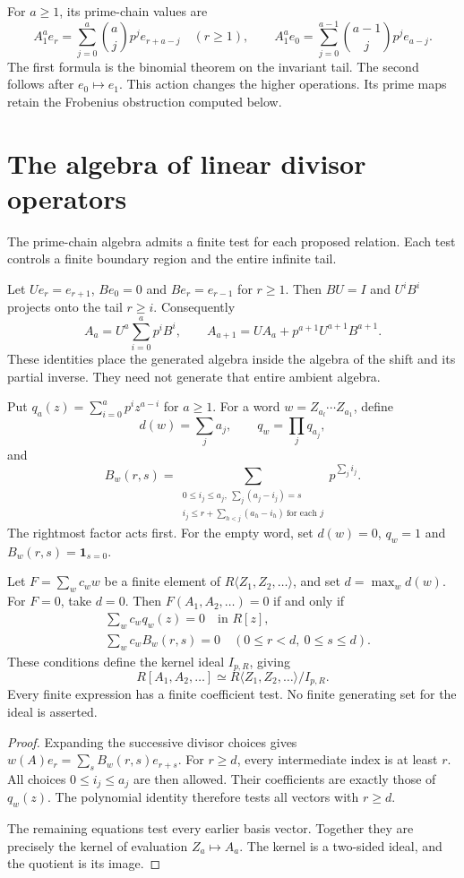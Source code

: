 For $a\geq1$, its prime-chain values are
\[
 A_1^ae_r=\sum_{j=0}^a\binom ajp^je_{r+a-j}\quad(r\geq1),
 \qquad
 A_1^ae_0=\sum_{j=0}^{a-1}\binom{a-1}jp^je_{a-j}.
\]
The first formula is the binomial theorem on the invariant tail.
The second follows after $e_0\mapsto e_1$.
This action changes the higher operations. Its prime maps retain
the Frobenius obstruction computed below.

\section{The algebra of linear divisor operators}
\label{v4-arith:hecke:sec:presentation}

The prime-chain algebra admits a finite test for each proposed relation.
Each test controls a finite boundary region and the entire infinite tail.

Let $Ue_r=e_{r+1}$, $Be_0=0$ and $Be_r=e_{r-1}$ for $r\geq1$.
Then $BU=I$ and $U^iB^i$ projects onto the tail $r\geq i$.
Consequently
\[
 A_a=U^a\sum_{i=0}^ap^iB^i,
 \qquad A_{a+1}=UA_a+p^{a+1}U^{a+1}B^{a+1}.
\]
These identities place the generated algebra inside the algebra of
the shift and its partial inverse. They need not generate that
entire ambient algebra.

Put $q_a(z)=\sum_{i=0}^ap^iz^{a-i}$ for $a\geq1$.
For a word $w=Z_{a_l}\cdots Z_{a_1}$, define
\[
 d(w)=\sum_ja_j,\qquad q_w=\prod_jq_{a_j},
\]
and
\[
 B_w(r,s)=
 \sum_{\substack{0\leq i_j\leq a_j,\ \sum_j(a_j-i_j)=s\\
 i_j\leq r+\sum_{h<j}(a_h-i_h)\ \text{for each }j}}
 p^{\sum_ji_j}.
\]
The rightmost factor acts first. For the empty word, set $d(w)=0$,
$q_w=1$ and $B_w(r,s)=\mathbf1_{s=0}$.

\begin{theorem}
\label{v4-arith:hecke:thm:presentation}
Let $F=\sum_wc_ww$ be a finite element of
$R\langle Z_1,Z_2,\ldots\rangle$, and set $d=\max_wd(w)$.
For $F=0$, take $d=0$.
Then $F(A_1,A_2,\ldots)=0$ if and only if
\begin{align*}
 &\sum_wc_wq_w(z)=0\quad\text{in }R[z],\\
 &\sum_wc_wB_w(r,s)=0
       \quad(0\leq r<d,\ 0\leq s\leq d).
\end{align*}
These conditions define the kernel ideal $I_{p,R}$, giving
\[
 R[A_1,A_2,\ldots]\simeq
 R\langle Z_1,Z_2,\ldots\rangle/I_{p,R}.
\]
Every finite expression has a finite coefficient test.
No finite generating set for the ideal is asserted.
\end{theorem}
\begin{proof}
Expanding the successive divisor choices gives
$w(A)e_r=\sum_sB_w(r,s)e_{r+s}$.
For $r\geq d$, every intermediate index is at least $r$.
All choices $0\leq i_j\leq a_j$ are then allowed.
Their coefficients are exactly those of $q_w(z)$.
The polynomial identity therefore tests all vectors with $r\geq d$.

The remaining equations test every earlier basis vector.
Together they are precisely the kernel of evaluation $Z_a\mapsto A_a$.
The kernel is a two-sided ideal, and the quotient is its image.
\end{proof}

